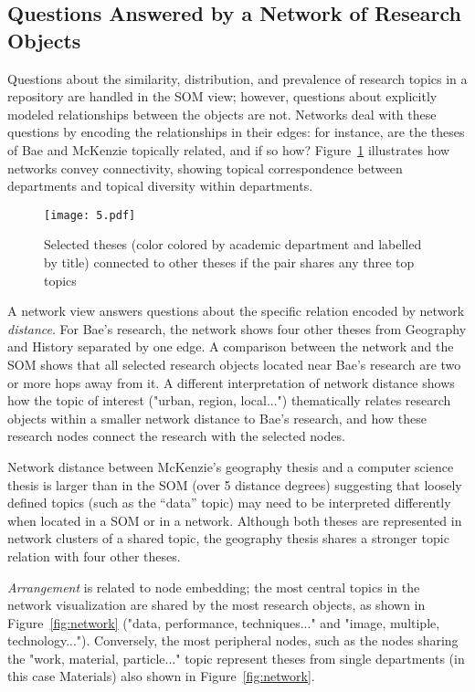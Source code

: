 \documentclass[a4paper,UKenglish]{lipics-v2018}
\begin{document}
\subsection{Questions Answered by a Network of Research Objects}
Questions about the similarity, distribution, and prevalence of research topics in a repository are handled in the SOM view; however, questions about explicitly modeled relationships between the objects are not. Networks deal with these questions by encoding the relationships in their edges: for instance, are the theses of Bae and McKenzie topically related, and if so how? Figure~\ref{fig:ex_network} illustrates how networks convey connectivity, showing topical correspondence between departments and topical diversity within departments.

\begin{figure}[ht]
    \centering
    \texttt{[image: 5.pdf]}
    \caption{Selected theses (color colored by academic department and labelled by title) connected to other theses if the pair shares any three top topics} 
    \label{fig:ex_network}
\end{figure}

A network view answers questions about the specific relation encoded by network \textit{distance}. For Bae’s research, the network shows four other theses from Geography and History separated by one edge. A comparison between the network and the SOM shows that all selected research objects located near Bae's research are two or more hops away from it. A different interpretation of network distance shows how the topic of interest ("urban, region, local...") thematically relates research objects within a smaller network distance to Bae’s research, and how these research nodes connect the research with the selected nodes. 

Network distance between McKenzie’s geography thesis and a computer science thesis is larger than in the SOM (over 5 distance degrees) suggesting that loosely defined topics (such as the “data” topic) may need to be interpreted differently when located in a SOM or in a network. Although both theses are represented in network clusters of a shared topic, the geography thesis shares a stronger topic relation with four other theses.

\textit{Arrangement} is related to node embedding; the most central topics in the network visualization are shared by the most research objects, as shown in Figure~\ref{fig:network} ("data, performance, techniques..." and "image, multiple, technology..."). Conversely, the most peripheral nodes, such as the nodes sharing the "work, material, particle..." topic represent theses from single departments (in this case Materials) also shown in Figure~\ref{fig:network}.
\end{document}
